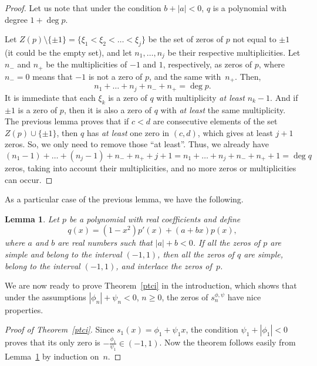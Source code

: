\documentclass[10pt, a4paper, leqno]{amsart}
\numberwithin{equation}{section}
\theoremstyle{plain}
\newtheorem{Lem}[Theo]{Lemma}
\theoremstyle{remark}
\newcommand{\spp}{s^{\phi,\psi}}
\begin{document}
\begin{proof}
Let us note that under the condition $b + |a| < 0$, $q$ is a polynomial with degree $1 + \deg p$.

Let $Z(p) \setminus \{\pm 1\} = \{\xi_1 < \xi_2 < \dots < \xi_j\}$ be the set of zeros of $p$ not equal to $\pm 1$ (it could be the empty set), and let $n_1, \dots, n_j$ be their respective multiplicities. Let $n_{-}$ and $n_{+}$ be the multiplicities of $-1$ and $1$, respectively, as zeros of $p$, where $n_{-} = 0$ means that $-1$ is not a zero of $p$, and the same with~$n_{+}$. Then,
\[
  n_1 + \dots + n_j + n_{-} + n_{+} = \deg p.
\]
It is immediate that each $\xi_k$ is a zero of $q$ with multiplicity \emph{at least} $n_k-1$. And if $\pm 1$ is a zero of $p$, then it is also a zero of $q$ with \emph{at least} the same multiplicity. The previous lemma proves that if $c < d$ are consecutive elements of the set $Z(p) \cup \{\pm 1\}$, then $q$ has \emph{at least} one zero in $(c,d)$, which gives at least $j+1$ zeros. So, we only need to remove those ``at least''. Thus, we already have
\[
  (n_1 - 1) + \dots + (n_j - 1) + n_{-} + n_{+} + j + 1
  = n_1 + \dots + n_j + n_{-} + n_{+} + 1
  = \deg q
\]
zeros, taking into account their multiplicities, and no more zeros or multiplicities can occur.
\end{proof}

As a particular case of the previous lemma, we have the following.

\begin{Lem}
\label{depaq}
Let $p$ be a polynomial with real coefficients and define
\[
  q(x) = (1-x^2) p'(x) + (a + b x) p(x),
\]
where $a$ and $b$ are real numbers such that $|a| + b < 0$. If all the zeros of $p$ are simple and belong to the interval $(-1,1)$, then all the zeros of $q$ are simple, belong to the interval $(-1,1)$, and interlace the zeros of~$p$.
\end{Lem}

We are now ready to prove Theorem~\ref{ptci} in the introduction, which shows that under the assumptions $|\phi_n| + \psi_n < 0$, $n\ge 0$, the zeros of $\spp_n$ have nice properties.

\begin{proof}[Proof of Theorem~\ref{ptci}]
Since $s_1(x) = \phi_1 + \psi_1 x$, the condition $\psi_1 + |\phi_1| < 0$ proves that its only zero is $- \frac{\phi_1}{\psi_1} \in (-1,1)$. Now the theorem follows easily from Lemma~\ref{depaq} by induction on~$n$.
\end{proof}
\end{document}
